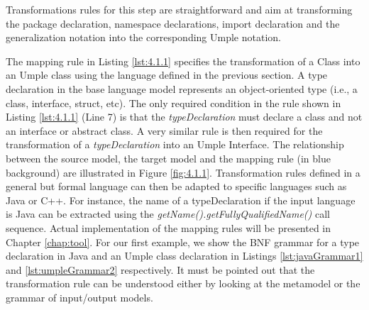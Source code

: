 Transformations rules for this step are straightforward and aim at transforming the package declaration, namespace declarations, import declaration and the generalization notation into the corresponding Umple notation. 

The mapping rule in Listing \ref{lst:4.1.1} specifies the transformation of a Class into an Umple class using the language defined in the previous section. A type declaration in the base language model represents an object-oriented type (i.e., a class, interface, struct, etc). The only required condition in the rule shown in Listing \ref{lst:4.1.1} (Line 7) is that the \textit{typeDeclaration} must declare a class and not an interface or abstract class. A very similar rule is then required for the transformation of a \textit{typeDeclaration} into an Umple Interface. The relationship between the source model, the target model and the mapping rule (in blue background) are illustrated in Figure \ref{fig:4.1.1}.
Transformation rules defined in a general but formal language can then be adapted to specific languages such as Java or C++. For instance, the name of a typeDeclaration if the input language is Java can be extracted using the \textit{getName().getFullyQualifiedName()} call sequence. Actual implementation of the mapping rules will be presented in Chapter \ref{chap:tool}. For our first example, we show the BNF grammar for a type declaration in Java and an Umple class declaration in Listings \ref{lst:javaGrammar1} and \ref{lst:umpleGrammar2} respectively. It must be pointed out that the transformation rule can be understood either by looking at the metamodel or the grammar of input/output models. 




